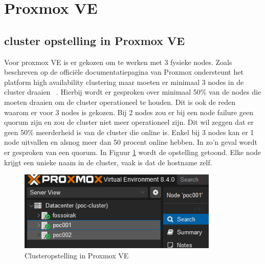 


\section{Proxmox VE}%
\label{sec:ProxomoxVE}
\subsection{cluster opstelling in Proxmox VE}
Voor proxmox VE is er gekozen om te werken met 3 fysieke nodes. Zoals beschreven op de officiële documentatiepagina van Proxmox ondersteunt het platform high availability clustering maar moeten er minimaal 3 nodes in de cluster draaien ~\autocite{proxmoxHA}.
Hierbij wordt er gesproken over minimaal 50\% van de nodes die moeten draaien om de cluster operationeel te houden. Dit is ook de reden waarom er voor 3 nodes is gekozen.
Bij 2 nodes zou er bij een node failure geen quorum zijn en zou de cluster niet meer operationeel zijn. Dit wil zeggen dat er geen 50\% meerderheid is van de cluster die online is. Enkel bij 3 nodes kan er 1 node uitvallen en alsnog meer dan 50 procent online hebben. In zo’n geval wordt er gesproken van een quorum.
In Figuur \ref{fig:cluster-proxmox} wordt de opstelling getoond. Elke node krijgt een unieke naam in de cluster, vaak is dat de hostname zelf.
\begin{figure}[H]
  \centering
  \includegraphics[width=0.85\textwidth]{../poc/cluster-info-prox.png}
  \caption{Clusteropstelling in Proxmox VE}
  \label{fig:cluster-proxmox}
\end{figure}
